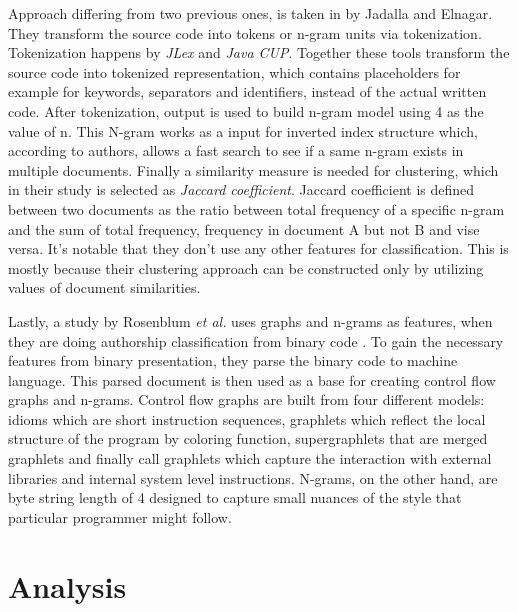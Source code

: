 \documentclass[english]{tktltiki2}
\theoremstyle{definition}
\theoremstyle{remark}
\begin{document}
Approach differing from two previous ones, is taken in \cite{jadalla2008pde4java} by Jadalla and Elnagar. They transform the source code into tokens or n-gram units via tokenization. Tokenization happens by \textit{JLex} and \textit{Java CUP}. Together these tools transform the source code into tokenized representation, which contains placeholders for example for keywords, separators and identifiers, instead of the actual written code. After tokenization, output is used to build n-gram model using 4 as the value of n. This N-gram works as a input for inverted index structure which, according to authors, allows a fast search to see if a same n-gram exists in multiple documents. Finally a similarity measure is needed for clustering, which in their study is selected as \textit{Jaccard coefficient}. Jaccard coefficient is defined between two documents as the ratio between total frequency of a specific n-gram and the sum of total frequency, frequency in document A but not B and vise versa. It's notable that they don't use any other features for classification. This is mostly because their clustering approach can be constructed only by utilizing values of document similarities.

Lastly, a study by Rosenblum \textit{et al.} uses graphs and n-grams as features, when they are doing authorship classification from binary code \cite{rosenblum2011wrote}. To gain the necessary features from binary presentation, they parse the binary code to machine language. This parsed document is then used as a base for creating control flow graphs and n-grams. Control flow graphs are built from four different models: idioms which are short instruction sequences, graphlets which reflect the local structure of the program by coloring function, supergraphlets that are merged graphlets and finally call graphlets which capture the interaction with external libraries and internal system level instructions. N-grams, on the other hand, are byte string length of 4 designed to capture small nuances of the style that particular programmer might follow.   


\section{Analysis}
\end{document}

